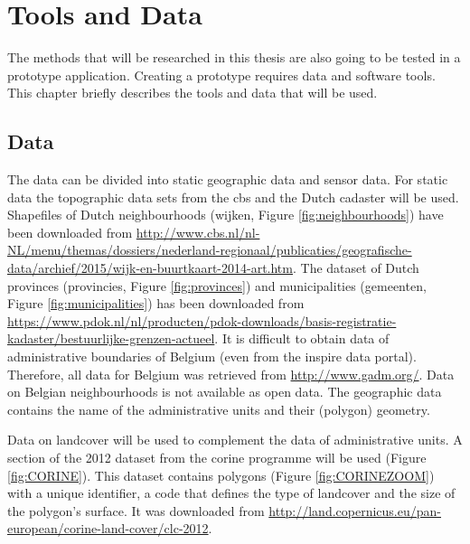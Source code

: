 

\section{Tools and Data}
\label{chap:TD}

The methods that will be researched in this thesis are also going to be tested in a prototype application. Creating a prototype requires data and software tools. This chapter briefly describes the tools and data that will be used.  

\subsection{Data}
\begin{sloppypar}
The data can be divided into static geographic data and sensor data. For static data the topographic data sets from the \ac{cbs} and the Dutch cadaster will be used. Shapefiles of Dutch neighbourhoods (wijken, Figure \ref{fig:neighbourhoods}) have been downloaded from \url{http://www.cbs.nl/nl-NL/menu/themas/dossiers/nederland-regionaal/publicaties/geografische-data/archief/2015/wijk-en-buurtkaart-2014-art.htm}. The dataset of Dutch provinces (provincies, Figure \ref{fig:provinces}) and municipalities (gemeenten, Figure \ref{fig:municipalities}) has been downloaded from \url{https://www.pdok.nl/nl/producten/pdok-downloads/basis-registratie-kadaster/bestuurlijke-grenzen-actueel}. It is difficult to obtain data of administrative boundaries of Belgium (even from the \ac{inspire} data portal). Therefore, all data for Belgium was retrieved from \url{http://www.gadm.org/}. Data on Belgian neighbourhoods is not available as open data. The geographic data contains the name of the administrative units and their (polygon) geometry.

Data on landcover will be used to complement the data of administrative units. A section of the 2012 dataset from the \ac{corine} programme will be used (Figure \ref{fig:CORINE}). This dataset contains polygons (Figure \ref{fig:CORINEZOOM}) with a unique identifier, a code that defines the type of landcover and the size of the polygon's surface. It was downloaded from \url{http://land.copernicus.eu/pan-european/corine-land-cover/clc-2012}. 
  
\end{sloppypar}

